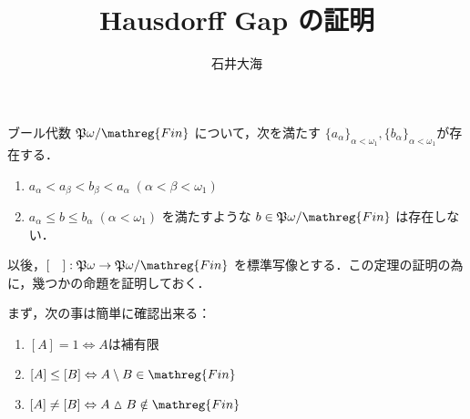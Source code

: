 \documentclass[a4j,xelatex,ja=standard]{bxjsarticle}
\title{Hausdorff Gap の証明}
\author{石井大海}
\newcommand{\Fin}{\mathreg{Fin}}
\begin{document}
\maketitle

\begin{theorem}[Hausdorff]
 ブール代数 $\mathfrak{P}\omega / \Fin$ について，次を満たす $\{a_\alpha\}_{\alpha < \omega_1}, \{b_\alpha\}_{\alpha < \omega_1}$が存在する．
 \begin{enumerate}
  \item $a_\alpha < a_\beta < b_\beta < a_\alpha\; (\alpha < \beta < \omega_1)$
  \item $a_\alpha \leq b \leq b_\alpha \; (\alpha < \omega_1)$ を満たすような $b \in \mathfrak{P}\omega / \Fin$ は存在しない．
 \end{enumerate}
\end{theorem}

以後，$[\quad]: \mathfrak{P}\omega \to \mathfrak{P}\omega/\Fin$ を標準写像とする．この定理の証明の為に，幾つかの命題を証明しておく．

まず，次の事は簡単に確認出来る：

\begin{fact}
 \begin{enumerate}[label=(\roman*)]
  \item $[A] = 1 \Leftrightarrow A \text{は補有限}$
  \item $[A] \leq [B] \Leftrightarrow A \setminus B \in \Fin$
  \item $[A] \neq [B] \Leftrightarrow A \vartriangle B \notin \Fin$
 \end{enumerate}
\end{fact}
\end{document}
